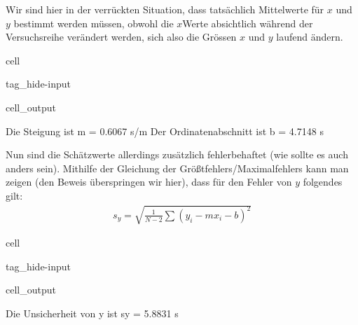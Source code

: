 \documentclass[letterpaper,10pt,english]{jupyterBook}
\begin{document}
\sphinxAtStartPar
Wir sind hier in der verrückten Situation, dass tatsächlich  Mittelwerte für \(x\) und \(y\) bestimmt werden müssen, obwohl die \(x\)\sphinxhyphen{}Werte absichtlich während der Versuchsreihe verändert werden, sich also die Grössen \(x\) und \(y\) laufend ändern.

\begin{sphinxuseclass}{cell}
\begin{sphinxuseclass}{tag_hide-input}\begin{sphinxVerbatimOutput}

\begin{sphinxuseclass}{cell_output}
\begin{sphinxVerbatim}[commandchars=\\\{\}]
Die Steigung ist 		 m = 0.6067 s/m
Der Ordinatenabschnitt ist 	 b = 4.7148 s
\end{sphinxVerbatim}

\noindent{}

\end{sphinxuseclass}\end{sphinxVerbatimOutput}

\end{sphinxuseclass}
\end{sphinxuseclass}
\sphinxAtStartPar
Nun sind die Schätzwerte allerdings zusätzlich fehlerbehaftet (wie sollte es auch anders sein). Mithilfe der Gleichung der Größtfehlers/Maximalfehlers kann man zeigen (den Beweis überspringen wir hier), dass für den Fehler von \(y\) folgendes gilt:
\begin{equation*}
\begin{split}s_y = \sqrt{\frac{1}{N-2}\sum(y_i - mx_i - b)^2 }\end{split}
\end{equation*}
\begin{sphinxuseclass}{cell}
\begin{sphinxuseclass}{tag_hide-input}\begin{sphinxVerbatimOutput}

\begin{sphinxuseclass}{cell_output}
\begin{sphinxVerbatim}[commandchars=\\\{\}]
Die Unsicherheit von y ist 	 s\PYGZus{}y = 5.8831 s
\end{sphinxVerbatim}

\end{sphinxuseclass}\end{sphinxVerbatimOutput}

\end{sphinxuseclass}
\end{sphinxuseclass}
\end{document}
